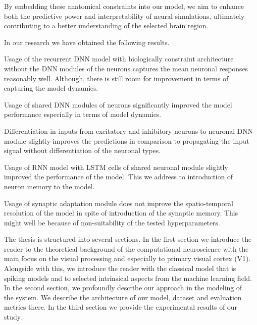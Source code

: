 By embedding these anatomical constraints into our model, we aim to
enhance both the predictive power and interpretability of neural simulations,
ultimately contributing to a better understanding of the selected brain region.

In our research we have obtained the following results. 
\begin{description}
    \item Usage of the recurrent DNN model with biologically constraint 
    architecture without the DNN modules of the neurons captures the 
    mean neuronal responses reasonably well. Although, there is still
    room for improvement in terms of capturing the model dynamics.
    \item Usage of shared DNN modules of neurons significantly improved the
    model performance especially in terms of model dynamics.
    \item Differentiation in inputs from excitatory and inhibitory
    neurons to neuronal DNN module slightly improves the predictions in
    comparison to propagating the input signal without differentiation
    of the neuronal types.
    \item Usage of RNN model with LSTM cells of shared neuronal module
    slightly improved the performance of the model. This we address to
    introduction of neuron memory to the model.
    \item Usage of synaptic adaptation module does not improve the
    spatio-temporal resolution of the model in spite of introduction of 
    the synaptic memory. This might well be because of non-suitability of
    the tested hyperparameters.
\end{description}

The thesis is structured into several sections. In the first section
we introduce the reader to the theoretical background of the computational
neuroscience with the main focus on the visual processing and especially
to primary visual cortex (V1). Alongside with this, we introduce the reader
with the classical model that is spiking models and to selected intrinsical
aspects from the machine learning field. In the second section, we profoundly
describe our approach in the modeling of the system. We describe the architecture
of our model, dataset and evaluation metrics there. In the third section
we provide the experimental results of our study.


